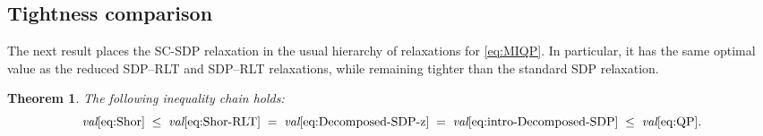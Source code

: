 \documentclass[11pt]{article}
\theoremstyle{plain}
\newtheorem{theorem}{Theorem}
\begin{document}
\subsection{Tightness comparison}\label{subsec:tightness-comparison}

The next result places the SC-SDP relaxation in the usual hierarchy of relaxations for \eqref{eq:MIQP}. In particular, it has the same optimal value as the reduced SDP--RLT and SDP--RLT relaxations, while remaining tighter than the standard SDP relaxation.

\begin{theorem}
\label{thm:equivalence} 
The following inequality chain holds:
\[
\emph{val} \eqref{eq:Shor}
\;\le\;
\emph{val} \eqref{eq:Shor-RLT}
\;=\;
\emph{val} \eqref{eq:Decomposed-SDP-z}
\;=\;
\emph{val} \eqref{eq:intro-Decomposed-SDP}
\;\le\; \emph{val} \eqref{eq:QP}.
\]
\end{theorem}
\end{document}
